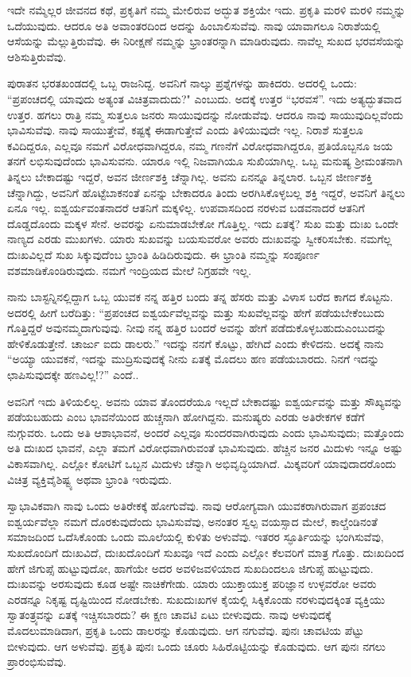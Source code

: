 ಇದೇ ನಮ್ಮೆಲ್ಲರ ಜೀವನದ ಕಥೆ, ಪ್ರಕೃತಿಗೆ ನಮ್ಮ ಮೇಲಿರುವ ಅದ್ಭುತ ಶಕ್ತಿಯೇ ಇದು. ಪ್ರಕೃತಿ ಮರಳಿ ಮರಳಿ ನಮ್ಮನ್ನು ಒದೆಯುವುದು. ಆದರೂ ಅತಿ ಅವಾಂತರದಿಂದ ಅದನ್ನು ಹಿಂಬಾಲಿಸುವೆವು. ನಾವು ಯಾವಾಗಲೂ ನಿರಾಶೆಯಲ್ಲಿ ಆಸೆಯನ್ನು ಮೆಲ್ಲುತ್ತಿರುವೆವು. ಈ ನಿರೀಕ್ಷಣೆ ನಮ್ಮನ್ನು ಭ್ರಾಂತರನ್ನಾಗಿ ಮಾಡಿರುವುದು. ನಾವೆಲ್ಲ ಸುಖದ ಭರವಸೆಯನ್ನು ಆಶಿಸುತ್ತಿರುವೆವು.

ಪುರಾತನ ಭರತಖಂಡದಲ್ಲಿ ಒಬ್ಬ ರಾಜನಿದ್ದ. ಅವನಿಗೆ ನಾಲ್ಕು ಪ್ರಶ್ನೆಗಳನ್ನು ಹಾಕಿದರು. ಅದರಲ್ಲಿ ಒಂದು: “ಪ್ರಪಂಚದಲ್ಲಿ ಯಾವುದು ಅತ್ಯಂತ ವಿಚಿತ್ರವಾದುದು?" ಎಂಬುದು. ಅದಕ್ಕೆ ಉತ್ತರ “ಭರವಸೆ”. ಇದು ಅತ್ಯದ್ಭುತವಾದ ಉತ್ತರ. ಹಗಲು ರಾತ್ರಿ ನಮ್ಮ ಸುತ್ತಲೂ ಜನರು ಸಾಯುವುದನ್ನು ನೋಡುವೆವು. ಆದರೂ ನಾವು ಸಾಯುವುದಿಲ್ಲವೆಂದು ಭಾವಿಸುವೆವು. ನಾವು ಸಾಯುತ್ತೇವೆ, ಕಷ್ಟಕ್ಕೆ ಈಡಾಗುತ್ತೇವೆ ಎಂದು ತಿಳಿಯುವುದೇ ಇಲ್ಲ. ನಿರಾಶೆ ಸುತ್ತಲೂ ಕವಿದಿದ್ದರೂ, ಎಲ್ಲವೂ ನಮಗೆ ವಿರೋಧವಾಗಿದ್ದರೂ, ನಮ್ಮ ಗಣನೆಗೆ ವಿರೋಧವಾಗಿದ್ದರೂ, ಪ್ರತಿಯೊಬ್ಬನೂ ಜಯ ತನಗೆ ಲಭಿಸುವುದೆಂದು ಭಾವಿಸುವನು. ಯಾರೂ ಇಲ್ಲಿ ನಿಜವಾಗಿಯೂ ಸುಖಿಯಾಗಿಲ್ಲ. ಒಬ್ಬ ಮನುಷ್ಯ ಶ‍್ರೀಮಂತನಾಗಿ ತಿನ್ನಲು ಬೇಕಾದಷ್ಟು ಇದ್ದರೆ, ಅವನ ಜೀರ್ಣಶಕ್ತಿ ಚೆನ್ನಾಗಿಲ್ಲ. ಅವನು ಏನನ್ನೂ ತಿನ್ನಲಾರ. ಒಬ್ಬನ ಜೀರ್ಣಶಕ್ತಿ ಚೆನ್ನಾಗಿದ್ದು, ಅವನಿಗೆ ಹೊಟ್ಟೆಬಾಕನಂತೆ ಏನನ್ನು ಬೇಕಾದರೂ ತಿಂದು ಅರಗಿಸಿಕೊಳ್ಳಬಲ್ಲ ಶಕ್ತಿ ಇದ್ದರೆ, ಅವನಿಗೆ ತಿನ್ನಲು ಏನೂ ಇಲ್ಲ. ಐಶ್ವರ್ಯವಂತನಾದರೆ ಆತನಿಗೆ ಮಕ್ಕಳಿಲ್ಲ. ಉಪವಾಸದಿಂದ ನರಳುವ ಬಡವನಾದರೆ ಆತನಿಗೆ ದೊಡ್ಡದೊಂದು ಮಕ್ಕಳ ಸೇನೆ. ಅವರನ್ನು ಏನುಮಾಡಬೇಕೋ ಗೊತ್ತಿಲ್ಲ. ಇದು ಏತಕ್ಕೆ? ಸುಖ ಮತ್ತು ದುಃಖ ಒಂದೇ ನಾಣ್ಯದ ಎರಡು ಮುಖಗಳು. ಯಾರು ಸುಖವನ್ನು ಬಯಸುವರೋ ಅವರು ದುಃಖವನ್ನು ಸ್ವೀಕರಿಸಬೇಕು. ನಮಗೆಲ್ಲ ದುಃಖವಿಲ್ಲದೆ ಸುಖ ಸಿಕ್ಕುವುದೆಂಬ ಭ್ರಾಂತಿ ಹಿಡಿದಿರುವುದು. ಈ ಭ್ರಾಂತಿ ನಮ್ಮನ್ನು ಸಂಪೂರ್ಣ ವಶಮಾಡಿಕೊಂಡಿರುವುದು. ನಮಗೆ ಇಂದ್ರಿಯದ ಮೇಲೆ ನಿಗ್ರಹವೇ ಇಲ್ಲ.

ನಾನು ಬಾಸ್ಟನ್ನಿನಲ್ಲಿದ್ದಾಗ ಒಬ್ಬ ಯುವಕ ನನ್ನ ಹತ್ತಿರ ಬಂದು ತನ್ನ ಹೆಸರು ಮತ್ತು ವಿಳಾಸ ಬರೆದ ಕಾಗದ ಕೊಟ್ಟನು. ಅದರಲ್ಲಿ ಹೀಗೆ ಬರೆದಿತ್ತು: “ಪ್ರಪಂಚದ ಐಶ್ವರ್ಯವೆಲ್ಲವನ್ನು ಮತ್ತು ಸುಖವೆಲ್ಲವನ್ನು ಹೇಗೆ ಪಡೆಯಬೇಕೆಂಬುದು ಗೊತ್ತಿದ್ದರೆ ಅವು\break ನಮ್ಮದಾಗುವುವು. ನೀವು ನನ್ನ ಹತ್ತಿರ ಬಂದರೆ ಅವನ್ನು ಹೇಗೆ ಪಡೆದುಕೊಳ್ಳಬಹುದು\break ಎಂಬುದನ್ನು ಹೇಳಿಕೊಡುತ್ತೇನೆ. ಚಾರ್ಜು ಐದು ಡಾಲರು.” ಇದನ್ನು ನನಗೆ ಕೊಟ್ಟು, ಹೇಗಿದೆ ಎಂದು ಕೇಳಿದನು. ಅದಕ್ಕೆ ನಾನು “ಅಯ್ಯಾ ಯುವಕನೆ, ಇದನ್ನು ಮುದ್ರಿಸುವುದಕ್ಕೆ ನೀನು ಏತಕ್ಕೆ ಮೊದಲು ಹಣ ಪಡೆಯಬಾರದು. ನಿನಗೆ ಇದನ್ನು ಛಾಪಿಸುವುದಕ್ಕೇ ಹಣವಿಲ್ಲ!?” ಎಂದೆ..

ಅವನಿಗೆ ಇದು ತಿಳಿಯಲಿಲ್ಲ. ಅವನು ಯಾವ ತೊಂದರೆಯೂ ಇಲ್ಲದೆ ಬೇಕಾದಷ್ಟು ಐಶ್ವರ್ಯವನ್ನು ಮತ್ತು ಸೌಖ್ಯವನ್ನು ಪಡೆಯಬಹುದು ಎಂಬ ಭಾವನೆಯಿಂದ ಹುಚ್ಚನಾಗಿ ಹೋಗಿದ್ದನು. ಮನುಷ್ಯರು ಎರಡು ಅತಿರೇಕಗಳ ಕಡೆಗೆ ನುಗ್ಗುವರು. ಒಂದು ಅತಿ ಆಶಾಭಾವನೆ, ಅಂದರೆ ಎಲ್ಲವೂ ಸುಂದರವಾಗಿರುವುದು ಎಂದು ಭಾವಿಸುವುದು; ಮತ್ತೊಂದು ಅತಿ ದುಃಖದ ಭಾವನೆ, ಎಲ್ಲಾ ತಮಗೆ ವಿರೋಧವಾಗಿರುವಂತೆ ಭಾವಿಸುವುದು. ಹೆಚ್ಚಿನ ಜನರ ಮಿದುಳು ಇನ್ನೂ ಅಷ್ಟು ವಿಕಾಸವಾಗಿಲ್ಲ. ಎಲ್ಲೋ ಕೋಟಿಗೆ ಒಬ್ಬನ ಮಿದುಳು ಚೆನ್ನಾಗಿ ಅಭಿವೃದ್ಧಿಯಾಗಿದೆ. ಮಿಕ್ಕವರಿಗೆ ಯಾವುದಾದರೊಂದು ವಿಚಿತ್ರ ವ್ಯಕ್ತಿವೈಶಿಷ್ಟ್ಯ ಅಥವಾ ಭ್ರಾಂತಿ ಇರುವುದು.

ಸ್ವಾಭಾವಿಕವಾಗಿ ನಾವು ಒಂದು ಅತಿರೇಕಕ್ಕೆ ಹೋಗುವೆವು. ನಾವು ಆರೋಗ್ಯವಾಗಿ ಯುವಕರಾಗಿರುವಾಗ ಪ್ರಪಂಚದ ಐಶ್ವರ್ಯವೆಲ್ಲಾ ನಮಗೆ ದೊರಕುವುದೆಂದು ಭಾವಿಸುವೆವು, ಅನಂತರ ಸ್ವಲ್ಪ ವಯಸ್ಸಾದ ಮೇಲೆ, ಕಾಲ್ಚೆಂಡಿನಂತೆ ಸಮಾಜದಿಂದ ಒದೆಸಿಕೊಂಡು ಒಂದು ಮೂಲೆಯಲ್ಲಿ ಕುಳಿತು ಅಳುವೆವು. ಇತರರ ಸ್ಫೂರ್ತಿಯನ್ನು ಭಂಗಿಸುವೆವು, ಸುಖದೊಂದಿಗೆ ದುಃಖವಿದೆ, ದುಃಖದೊಂದಿಗೆ ಸುಖವೂ ಇದೆ ಎಂದು ಎಲ್ಲೋ ಕೆಲವರಿಗೆ ಮಾತ್ರ ಗೊತ್ತು. ದುಃಖದಿಂದ ಹೇಗೆ ಜಿಗುಪ್ಸೆ ಹುಟ್ಟುವುದೋ, ಹಾಗೆಯೇ ಅದರ ಅವಳಿಜವಳಿಯಾದ ಸುಖದಿಂದಲೂ ಜಿಗುಪ್ಸೆ ಹುಟ್ಟುವುದು. ದುಃಖವನ್ನು ಅರಸುವುದು ಕೂಡ ಅಷ್ಟೇ ನಾಚಿಕೆಗೇಡು. ಯಾರು ಯುಕ್ತಾಯುಕ್ತ ಪರಿಜ್ಞಾನ ಉಳ್ಳವರೋ ಅವರು ಎರಡನ್ನೂ ನಿಕೃಷ್ಟ ದೃಷ್ಟಿಯಿಂದ ನೋಡಬೇಕು. ಸುಖದುಃಖಗಳ ಕೈಯಲ್ಲಿ ಸಿಕ್ಕಿಕೊಂಡು ನರಳುವುದಕ್ಕಿಂತ ವ್ಯಕ್ತಿಯು ಸ್ವಾತಂತ್ರ್ಯವನ್ನು ಏತಕ್ಕೆ ಇಚ್ಚಿಸಬಾರದು? ಈ ಕ್ಷಣ ಚಾವಟಿ ಏಟು ಬೀಳುವುದು. ನಾವು ಅಳುವುದಕ್ಕೆ ಮೊದಲುಮಾಡಿದಾಗ, ಪ್ರಕೃತಿ ಒಂದು ಡಾಲರನ್ನು ಕೊಡುವುದು. ಆಗ ನಗುವೆವು. ಪುನಃ ಚಾವಟಿಯ ಪೆಟ್ಟು ಬೀಳುವುದು. ಆಗ ಅಳುವೆವು. ಪ್ರಕೃತಿ ಪುನಃ ಒಂದು ಚೂರು ಸಿಹಿರೊಟ್ಟಿಯನ್ನು ಕೊಡುವುದು. ಆಗ ಪುನಃ ನಗಲು ಪ್ರಾರಂಭಿಸುವೆವು.

